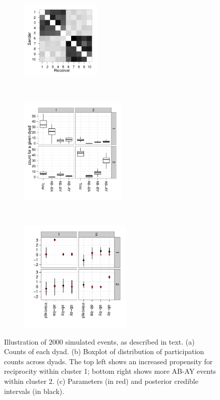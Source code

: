 \begin{figure}
\begin{subfigure}[b]{0.25\textwidth}
\centering
\includegraphics[width=1.5in]{../figs/synthetic/mat.pdf} %
\vspace{.25cm}
\caption{}
\end{subfigure}
~
\begin{subfigure}[b]{0.3\textwidth}
\centering
\includegraphics[width=2in]{../figs/synthetic/counts.pdf}
\caption{}
\end{subfigure}
~
\begin{subfigure}[b]{0.3\textwidth}
\centering
\includegraphics[width=2.1in]{../figs/synthetic/params-estimates.pdf}
\vspace{-.5cm}
\caption{}
\end{subfigure}
\caption{Illustration of 2000 simulated events, as described in text. (a) Counts of each dyad. (b) Boxplot of distribution of participation counts across dyads.  The top left shows an increased propensity for reciprocity within cluster 1; bottom right shows more AB-AY events within cluster 2.  (c) Parameters (in red) and posterior credible intervals (in black).}
\label{fig:syncounts}
\end{figure}

